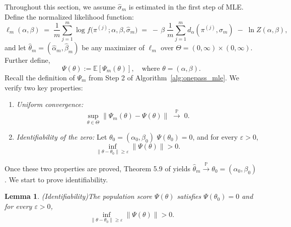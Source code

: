 \documentclass{article}
\renewcommand{\P}{\mathbb{P}}
\newcommand{\E}{ \mathbb{E}}
\newtheorem{lemma}[theorem]{Lemma}     %
\begin{document}
Throughout this section, we assume $\hat\sigma_m$ is estimated in the first step of MLE. Define the normalized likelihood function:
\[
\ell_m(\alpha,\beta)
\;=\;
\frac{1}{m}\sum_{j=1}^m\log f\bigl(\pi^{(j)};\alpha,\beta,\hat\sigma_m\bigr)
\;=\;
-\,\beta\;\frac1m\sum_{j=1}^m d_\alpha(\pi^{(j)},\hat\sigma_m)
\;-\;\ln Z(\alpha,\beta),
\]
and let 
\(\hat\theta_m=(\hat\alpha_m,\hat\beta_m)\)
be any maximizer of \(\ell_m\) over 
\(\Theta=(0,\infty)\times(0,\infty)\).   Further  define,
\[
\Psi(\theta):=\E[\Psi_m(\theta)],
\quad
\text{where }\theta=(\alpha,\beta).
\]
Recall the definition of $\Psi_m$ from Step 2 of Algorithm~\ref{alg:onepass_mle}.
We verify two key properties:
\begin{enumerate}
  \item  {\it Uniform convergence:}
    \[
      \sup_{\theta\in\Theta}
      \bigl\|\Psi_m(\theta)-\Psi(\theta)\bigr\|
      \;\xrightarrow{\P}\;0.
    \]
  \item  {\it Identifiability of the zero:} Let $\theta_0=(\alpha_0,\beta_0)$
    \(\Psi(\theta_0)=0\), and for every \(\varepsilon>0\),
    \[
       \inf_{\|\theta-\theta_0\|\ge\varepsilon}
       \bigl\|\Psi(\theta)\bigr\|
      >0.
    \]
\end{enumerate}
Once these two properties are proved, Theorem 5.9 of \cite{van2000asymptotic} yields  
\(\hat\theta_m\xrightarrow{\P}\theta_0=(\alpha_0,\beta_0)\). We start to prove identifiability.


\begin{lemma}(Identifiability)\label{lm: identifiable}
The population score \(\Psi(\theta)\) satisfies
\(\Psi(\theta_0)=0\) and for every \(\varepsilon>0\),
\[
\inf_{\|\theta-\theta_0\|\ge\varepsilon}
\|\Psi(\theta)\|
>0.
\]
\end{lemma}
\end{document}
